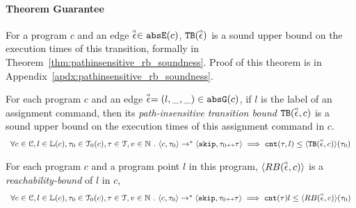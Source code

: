 \paragraph{Theorem Guarantee}
For a program $c$ and an edge $\stackrel{\scriptscriptstyle{\alpha}}{\mathtt{\epsilon}{}} \in \mathtt{abs}{\mathtt{E}}(c)$,
${\mathtt{TB}}(\stackrel{\scriptscriptstyle{\alpha}}{\mathtt{\epsilon}{}})$ is a sound upper bound
on the execution times of this transition,
formally in Theorem~\ref{thm:pathinsensitive_rb_soundness}. 
Proof of this theorem is in Appendix~\ref{apdx:pathinsensitive_rb_soundness}.
%
\begin{lem}
  \label{lem:edge_pathinsensitive_bound_soundness}
For each program ${c}$ and an edge $\stackrel{\scriptscriptstyle{\alpha}}{\mathtt{\epsilon}{}} = (l, \_, \_) \in \mathtt{abs}{\mathtt{G}}(c)$, if $l$ is the label of an assignment command,
then its \emph{path-insensitive transition bound} ${\mathtt{TB}}(\stackrel{\scriptscriptstyle{\alpha}}{\mathtt{\epsilon}{}}, c)$ 
 is a sound upper bound on 
the execution times of this assignment command in $c$.
  \[
    \begin{array}{l}
      \forall c \in \mathcal{C}, l \in \mathbb{L}(c),\mathtt{\tau}_0 \in \mathcal{T}_0(c), 
      \mathtt{\tau} \in \mathcal{T}, v \in \mathbb{N}
       ~.~ 
       \langle {c}, \mathtt{\tau}_0 \rangle \to^{*} \langle \mathtt{skip}, \mathtt{\tau}_0{\scriptscriptstyle ++}\mathtt{\tau} \rangle 
      \implies
      \mathtt{cnt}(\mathtt{\tau}, l) \leq \langle {\ensuremath{\mathtt{TB}}}(\stackrel{\scriptscriptstyle{\alpha}}{\mathtt{\epsilon}{}}, c) \rangle(\mathtt{\tau}_0)
    \end{array}
    \]
\end{lem}
%
\begin{thm}
  \label{thm:pathinsensitive_rb_soundness}
For each program ${c}$ and a program point $l$ in this program,
$\langle RB(\stackrel{\scriptscriptstyle{\alpha}}{\mathtt{\epsilon}{}}, c) \rangle$
 is a \emph{reachability-bound} of $l$ in $c$,
  \[
    \begin{array}{l}
      \forall c \in \mathcal{C}, l \in \mathbb{L}(c),\mathtt{\tau}_0 \in \mathcal{T}_0(c), 
      \mathtt{\tau} \in \mathcal{T}, v \in \mathbb{N}
       ~.~ 
      \langle {c}, \mathtt{\tau}_0 \rangle \to^{*} \langle \mathtt{skip}, \mathtt{\tau}_0{\scriptscriptstyle ++}\mathtt{\tau} \rangle 
      \implies
      \mathtt{cnt}(\mathtt{\tau})l
      \leq \langle RB(\stackrel{\scriptscriptstyle{\alpha}}{\mathtt{\epsilon}{}}, c) \rangle(\mathtt{\tau}_0)
    \end{array}
    \]
\end{thm}

